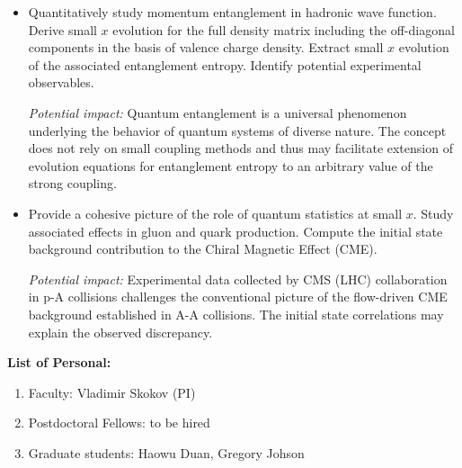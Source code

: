 \begin{itemize}
	\item Quantitatively study momentum entanglement in hadronic wave function. Derive 
		small $x$ evolution for the full density matrix including the off-diagonal components 
		in the basis of valence charge density. 
		Extract small $x$ evolution of the associated entanglement entropy. Identify potential 
		experimental observables. 

		{\it Potential impact:} Quantum entanglement is a universal phenomenon underlying 
		the behavior of quantum systems of diverse nature. The concept
		does not rely on small coupling methods and thus may facilitate extension of 
		evolution equations for entanglement entropy to an arbitrary value of the strong coupling.     
		

	\item Provide a cohesive picture of the role of quantum statistics at small $x$. 
		Study associated effects in gluon and quark production. Compute the initial state
		background contribution to the Chiral Magnetic Effect (CME). 
		
		{\it Potential impact:} Experimental data collected by CMS (LHC) collaboration in p-A collisions
		challenges the conventional picture of the flow-driven CME background established in A-A
		collisions. The initial state correlations may explain the observed discrepancy.     


\end{itemize}

\vspace{0.5em}
\noindent
{\bf List of Personal:}
\begin{enumerate}
	\item Faculty: Vladimir Skokov (PI)
	\item Postdoctoral Fellows: to be hired 
	\item Graduate students:  Haowu Duan,  Gregory Johson 
\end{enumerate}

